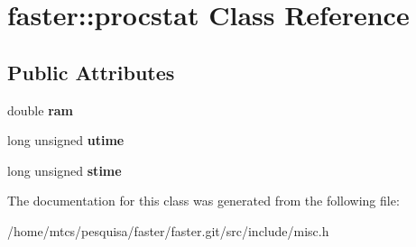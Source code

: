 \hypertarget{classfaster_1_1procstat}{}\section{faster\+:\+:procstat Class Reference}
\label{classfaster_1_1procstat}
\subsection*{Public Attributes}
\begin{DoxyCompactItemize}
\item 
\hypertarget{classfaster_1_1procstat_ad12d45d3f1d819e7613411835af89432}{}double {\bfseries ram}\label{classfaster_1_1procstat_ad12d45d3f1d819e7613411835af89432}

\item 
\hypertarget{classfaster_1_1procstat_a3033ca3dd5cf4fcca5d4f647149d21f7}{}long unsigned {\bfseries utime}\label{classfaster_1_1procstat_a3033ca3dd5cf4fcca5d4f647149d21f7}

\item 
\hypertarget{classfaster_1_1procstat_a8972e2ce24bf1961693edbd76344d1fd}{}long unsigned {\bfseries stime}\label{classfaster_1_1procstat_a8972e2ce24bf1961693edbd76344d1fd}

\end{DoxyCompactItemize}


The documentation for this class was generated from the following file\+:\begin{DoxyCompactItemize}
\item 
/home/mtcs/pesquisa/faster/faster.\+git/src/include/misc.\+h\end{DoxyCompactItemize}
